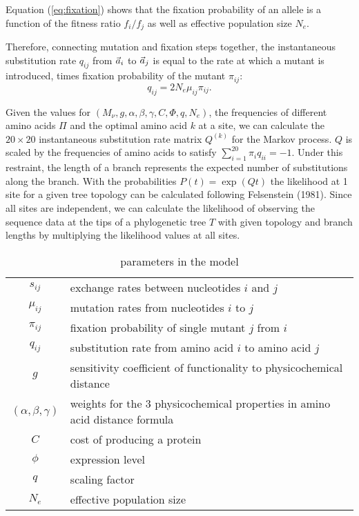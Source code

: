 Equation (\ref{eq:fixation}) shows that the fixation probability of an allele is a function of the fitness ratio $f_i/f_j$ as well as effective population size $N_e$.


Therefore, connecting mutation and fixation steps together, the instantaneous substitution rate $q_{ij}$ from $\vec{a}_i$ to $\vec{a}_j$ is equal to the rate at which a mutant is introduced,  times fixation probability of the mutant $\pi_{ij}$:
\begin{equation}
q_{ij} = 2N_e \mu_{ij} \pi_{ij}.
\label{eq:subrate}
\end{equation}


Given the values for $\left(M_{\nu},g, \alpha, \beta, \gamma, C, \Phi, q, N_e\right)$, the frequencies of different amino acids $\Pi$ and the optimal amino acid $k$ at a site, we can calculate the $20 \times 20$ instantaneous substitution rate matrix $Q^{(k)}$ for the Markov process. 
$Q$ is scaled by the frequencies of amino acids to satisfy $\sum_{i=1}^{20} \pi_i q_{ii}= -1$.
Under this restraint, the length of a branch represents the expected number of substitutions along the branch.
With the probabilities $P(t)  = \exp\left(Q t\right)$ the likelihood at 1 site for a given tree topology can be calculated following Felsenstein (1981).
Since all sites are independent, we can calculate the likelihood of observing the sequence data at the tips of a phylogenetic tree $T$ with given topology and branch lengths by multiplying the likelihood values at all sites.\\

\begin{table}[h]
\centering
\caption{parameters in the model}
\begin{tabular}{ c p{10cm} }
\hline
$s_{ij}$ & exchange rates between nucleotides $i$ and $j$ \\
$\mu_{ij}$ & mutation rates from nucleotides $i$ to $j$\\
$\pi_{ij}$ & fixation probability of single mutant $j$ from $i$\\
$q_{ij}$ & substitution rate from amino acid $i$ to amino acid $j$\\
$g$       & sensitivity coefficient of functionality to physicochemical distance \\
$(\alpha,\beta,\gamma)$ & weights for the 3 physicochemical properties in amino acid distance formula \\
$C$ & cost of producing a protein\\
$\phi$ & expression level \\
$q$ & scaling factor \\
$N_e$ & effective population size \\
\hline
\end{tabular}

\label{tb: para}
\end{table}


